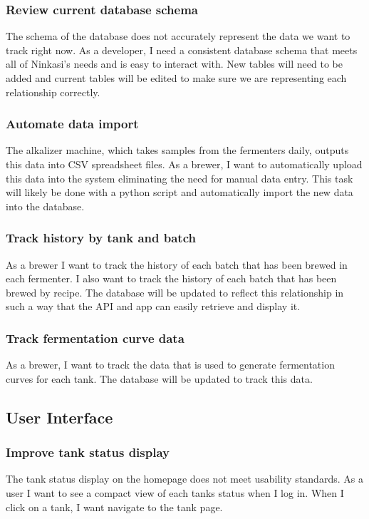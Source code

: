         \subsubsection{Review current database schema}
        The schema of the database does not accurately represent the data we want to track right now. As a developer, I need a consistent database schema that meets all of Ninkasi's needs and is easy to interact with. New tables will need to be added and current tables will be edited to make sure we are representing each relationship correctly.
        \subsubsection{Automate data import}
        The alkalizer machine, which takes samples from the fermenters daily, outputs this data into CSV spreadsheet files. As a brewer, I want to automatically upload this data into the system eliminating the need for manual data entry. This task will likely be done with a python script and automatically import the new data into the database.
        \subsubsection{Track history by tank and batch}
        As a brewer I want to track the history of each batch that has been brewed in each fermenter. I also want to track the history of each batch that has been brewed by recipe. The database will be updated to reflect this relationship in such a way that the API and app can easily retrieve and display it.
        \subsubsection{Track fermentation curve data}
        As a brewer, I want to track the data that is used to generate fermentation curves for each tank. The database will be updated to track this data.
    \subsection{User Interface}
        \subsubsection{Improve tank status display}
        The tank status display on the homepage does not meet usability standards. As a user I want to see a compact view of each tanks status when I log in. When I click on a tank, I want navigate to the tank page. 
